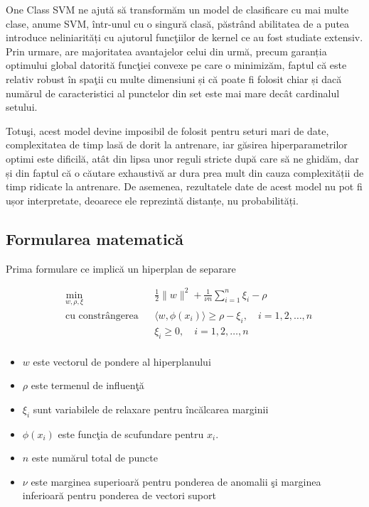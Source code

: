 One Class SVM ne ajută să transformăm un model de clasificare 
cu mai multe clase, anume SVM, într-unul cu o singură clasă,
păstrând abilitatea de a putea introduce neliniarități 
cu ajutorul funcţiilor de kernel ce au fost studiate extensiv.
Prin urmare, are majoritatea avantajelor celui din urmă, precum
garanția optimului global datorită funcţiei convexe pe care
o minimizăm, faptul că este relativ robust în spaţii cu 
multe dimensiuni și că poate fi folosit chiar și dacă 
numărul de caracteristici al punctelor din set este mai
mare decât cardinalul setului.

Totuşi, acest model devine imposibil de folosit pentru 
seturi mari de date, complexitatea de timp lasă de dorit 
la antrenare, iar găsirea hiperparametrilor optimi este 
dificilă, atât din lipsa unor reguli stricte după care 
să ne ghidăm, dar și din faptul că o căutare exhaustivă 
ar dura prea mult din cauza complexității de timp ridicate 
la antrenare. De asemenea, rezultatele date de acest model 
nu pot fi ușor interpretate, deoarece ele reprezintă distanțe,
nu probabilități.

\subsection{Formularea matematică}

Prima formulare ce implică un hiperplan de separare

\begin{equation}
    \begin{aligned}
    & \underset{w, \rho, \xi}{\text{min}}
    & & \frac{1}{2} \|w\|^2 + \frac{1}{\nu n} \sum_{i=1}^{n} \xi_i - \rho \\
    & \text{cu constrângerea}
    & & \langle w, \phi(x_i) \rangle \geq \rho - \xi_i, \quad i=1,2,\ldots,n \\
    &&& \xi_i \geq 0, \quad i=1,2,\ldots,n \\
    \end{aligned}
    \end{equation}
    
    \begin{itemize}
        \item $w$ este vectorul de pondere al hiperplanului
        \item $\rho$ este termenul de influenţă
        \item $\xi_i$ sunt variabilele de relaxare pentru încălcarea marginii
        \item $\phi(x_i)$ este funcţia de scufundare pentru $x_i$.
        \item $n$ este numărul total de puncte
        \item $\nu$ este marginea superioară pentru ponderea de anomalii şi marginea 
        inferioară pentru ponderea de vectori suport
    
    \end{itemize}


